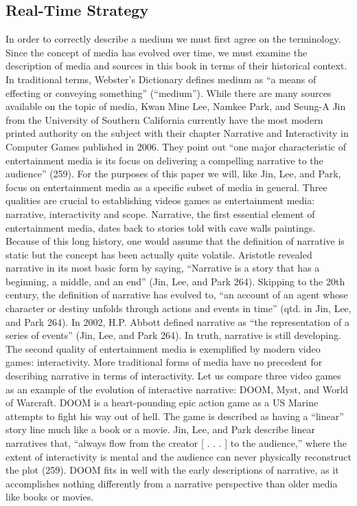 \subsection{Real-Time Strategy}
In order to correctly describe a medium we must first agree on the terminology.  Since the concept of media has evolved over time, we must examine the description of media and sources in this book in terms of their historical context. In traditional terms, Webster’s Dictionary defines medium as “a means of effecting or conveying something” (“medium”). While there are many sources available on the topic of media, Kwan Mine Lee, Namkee Park, and Seung-A Jin from the University of Southern California currently have the most modern printed authority on the subject with their chapter Narrative and Interactivity in Computer Games published in 2006. They point out “one major characteristic of entertainment media is its focus on delivering a compelling narrative to the audience” (259).  For the purposes of this paper we will, like Jin, Lee, and Park, focus on entertainment media as a specific subset of media in general.
Three qualities are crucial to establishing videos games as entertainment media: narrative, interactivity and scope.  Narrative, the first essential element of entertainment media, dates back to stories told with cave walls paintings.  Because of this long history, one would assume that the definition of narrative is static but the concept has been actually quite volatile.  Aristotle revealed narrative in its most basic form by saying, “Narrative is a story that has a beginning, a middle, and an end” (Jin, Lee, and Park 264).  Skipping to the 20th century, the definition of narrative has evolved to, “an account of an agent whose character or destiny unfolds through actions and events in time” (qtd. in Jin, Lee, and Park 264).  In 2002, H.P. Abbott defined narrative as “the representation of a series of events” (Jin, Lee, and Park 264).  In truth, narrative is still developing.  
The second quality of entertainment media is exemplified by modern video games: interactivity.   More traditional forms of media have no precedent for describing narrative in terms of interactivity. Let us compare three video games as an example of the evolution of interactive narrative: DOOM, Myst, and World of Warcraft.  
DOOM is a heart-pounding epic action game as a US Marine attempts to fight his way out of hell.  The game is described as having a “linear” story line much like a book or a movie.  Jin, Lee, and Park describe linear narratives that, “always flow from the creator [ . . . ] to the audience,” where the extent of interactivity is mental and the audience can never physically reconstruct the plot (259).  DOOM fits in well with the early descriptions of narrative, as it accomplishes nothing differently from a narrative perspective than older media like books or movies. 
